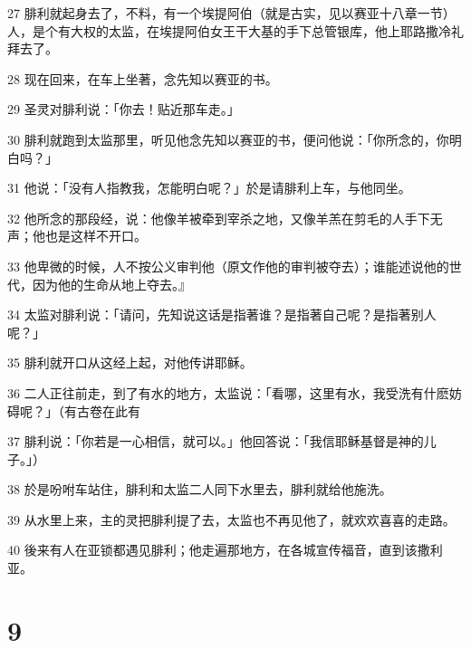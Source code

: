 \par 27 腓利就起身去了，不料，有一个埃提阿伯（就是古实，见以赛亚十八章一节）人，是个有大权的太监，在埃提阿伯女王干大基的手下总管银库，他上耶路撒冷礼拜去了。
\par 28 现在回来，在车上坐著，念先知以赛亚的书。
\par 29 圣灵对腓利说：「你去！贴近那车走。」
\par 30 腓利就跑到太监那里，听见他念先知以赛亚的书，便问他说：「你所念的，你明白吗？」
\par 31 他说：「没有人指教我，怎能明白呢？」於是请腓利上车，与他同坐。
\par 32 他所念的那段经，说：他像羊被牵到宰杀之地，又像羊羔在剪毛的人手下无声；他也是这样不开口。
\par 33 他卑微的时候，人不按公义审判他（原文作他的审判被夺去）；谁能述说他的世代，因为他的生命从地上夺去。』
\par 34 太监对腓利说：「请问，先知说这话是指著谁？是指著自己呢？是指著别人呢？」
\par 35 腓利就开口从这经上起，对他传讲耶稣。
\par 36 二人正往前走，到了有水的地方，太监说：「看哪，这里有水，我受洗有什麽妨碍呢？」（有古卷在此有
\par 37 腓利说：「你若是一心相信，就可以。」他回答说：「我信耶稣基督是神的儿子。」）
\par 38 於是吩咐车站住，腓利和太监二人同下水里去，腓利就给他施洗。
\par 39 从水里上来，主的灵把腓利提了去，太监也不再见他了，就欢欢喜喜的走路。
\par 40 後来有人在亚锁都遇见腓利；他走遍那地方，在各城宣传福音，直到该撒利亚。

\chapter{9}


